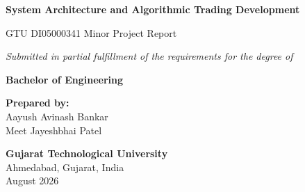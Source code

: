 \documentclass[12pt,a4paper,oneside]{report}
\begin{document}
\begin{titlepage}
    \begin{center}
        \vspace*{1.5cm}
        
        \Huge
        \textbf{\textcolor{gtu_blue}{System Architecture and Algorithmic Trading Development}}
        
        \vspace{0.8cm}
        \LARGE
        GTU DI05000341 Minor Project Report
        
        \vspace{1.5cm}
        
        \Large
        \textit{Submitted in partial fulfillment of the requirements for the degree of}
        
        \vspace{0.5cm}
        \textbf{Bachelor of Engineering}
        
        \vspace{2cm}
        
        \textbf{Prepared by:} \\
        Aayush Avinash Bankar \\
        Meet Jayeshbhai Patel
        
        \vfill
        
        \vspace{1.5cm}
        
        \Large
        \textbf{Gujarat Technological University} \\
        \normalsize
        Ahmedabad, Gujarat, India \\
        \vspace{0.5cm}
        August 2026
        
    \end{center}
\end{titlepage}

\tableofcontents
\clearpage
{}
\listoffigures
\clearpage
{}
\listoftables
\clearpage








\end{document}
